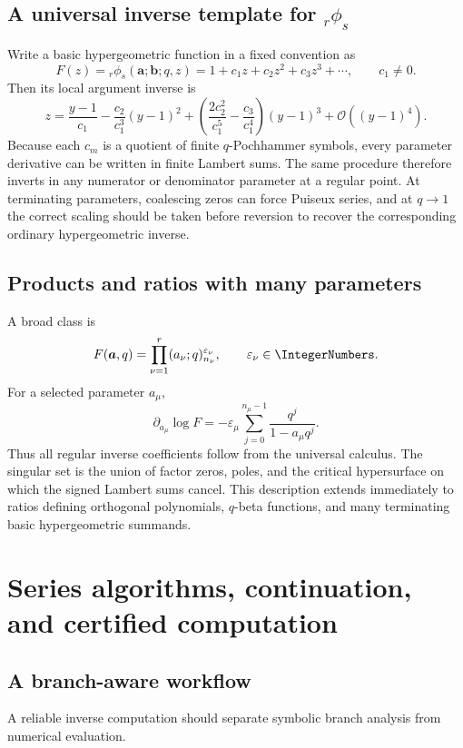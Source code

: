\documentclass[11pt,oneside]{book}
\theoremstyle{definition}
\theoremstyle{remark}
\newcommand{\OO}{\mathcal{O}}
\newcommand{\eps}{\varepsilon}
\begin{document}
\section{A universal inverse template for ${}_r\phi_s$}
Write a basic hypergeometric function in a fixed convention as
\[
 F(z)={}_r\phi_s(\bm a;\bm b;q,z)
 =1+c_1z+c_2z^2+c_3z^3+\cdots,
 \qquad c_1\ne0.
\]
Then its local argument inverse is
\begin{equation}\label{eq:basic-hypergeom-inverse}
 z=\frac{y-1}{c_1}-\frac{c_2}{c_1^3}(y-1)^2
 +\left(\frac{2c_2^2}{c_1^5}-\frac{c_3}{c_1^4}\right)(y-1)^3
 +\OO((y-1)^4).
\end{equation}
Because each $c_m$ is a quotient of finite $q$-Pochhammer symbols, every
parameter derivative can be written in finite Lambert sums.  The same
procedure therefore inverts in any numerator or denominator parameter at a
regular point.  At terminating parameters, coalescing zeros can force
Puiseux series, and at $q\to1$ the correct scaling should be taken before
reversion to recover the corresponding ordinary hypergeometric inverse.

\section{Products and ratios with many parameters}
A broad class is
\begin{equation}\label{eq:multi-product}
 F(\bm a,q)=\prod_{\nu=1}^r(a_\nu;q)_{n_\nu}^{\eps_\nu},
 \qquad \eps_\nu\in\IntegerNumbers.
\end{equation}
For a selected parameter $a_\mu$,
\[
 \partial_{a_\mu}\log F
 =-\eps_\mu\sum_{j=0}^{n_\mu-1}
 \frac{q^j}{1-a_\mu q^j}.
\]
Thus all regular inverse coefficients follow from the universal calculus.
The singular set is the union of factor zeros, poles, and the critical
hypersurface on which the signed Lambert sums cancel.  This description
extends immediately to ratios defining orthogonal polynomials, $q$-beta
functions, and many terminating basic hypergeometric summands.

\chapter{Series algorithms, continuation, and certified computation}

\section{A branch-aware workflow}
A reliable inverse computation should separate symbolic branch analysis from
numerical evaluation.
\end{document}
